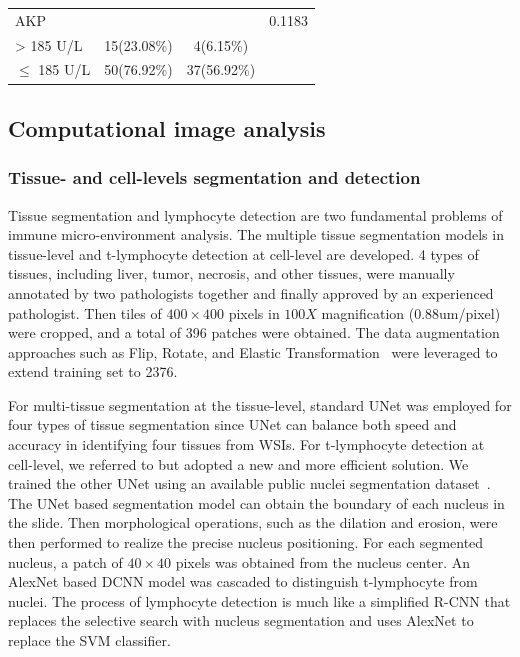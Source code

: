 \documentclass[num-refs]{wiley-article}
\begin{document}
\begin{table}[]
\begin{center}
\begin{tabular}{|l|c|c|c|}
AKP                                            &              &             & 0.1183 \\ \cline{1-3}
\quad \textgreater{} 185 U/L                          & 15(23.08\%)  & 4(6.15\%)   &                         \\ \cline{1-3}
\quad $\leq$ 185 U/L                                       & 50(76.92\%)  & 37(56.92\%) &                         \\ \hline
\end{tabular}
\label{Tab1}
\end{center}
\end{table}

\subsection{Computational image analysis}

\subsubsection{Tissue- and cell-levels segmentation and detection}
Tissue segmentation and lymphocyte detection are two fundamental problems of immune micro-environment analysis. The multiple tissue segmentation models in tissue-level and t-lymphocyte detection at cell-level are developed. 4 types of tissues, including liver, tumor, necrosis, and other tissues, were manually annotated by two pathologists together and finally approved by an experienced pathologist. Then tiles of $400\times400$ pixels in $100X$ magnification (0.88um/pixel) were cropped, and a total of 396 patches were obtained. The data augmentation approaches such as Flip, Rotate, and Elastic Transformation~\cite{buslaev2020albumentations} were leveraged to extend training set to 2376.

For multi-tissue segmentation at the tissue-level, standard UNet was employed for four types of tissue segmentation since UNet can balance both speed and accuracy in identifying four tissues from WSIs. For t-lymphocyte detection at cell-level, we referred to \cite{xu2015stacked} but adopted a new and more efficient solution. We trained the other UNet using an available public nuclei segmentation dataset~\cite{kumar2017dataset}. The UNet based segmentation model can obtain the boundary of each nucleus in the slide. Then morphological operations, such as the dilation and erosion, were then performed to realize the precise nucleus positioning. For each segmented nucleus, a patch of $40\times40$ pixels was obtained from the nucleus center. An AlexNet based DCNN model \cite{krizhevsky2012imagenet} was cascaded to distinguish t-lymphocyte from nuclei. The process of lymphocyte detection is much like a simplified R-CNN that replaces the selective search with nucleus segmentation and uses AlexNet to replace the SVM classifier. 
\end{document}
